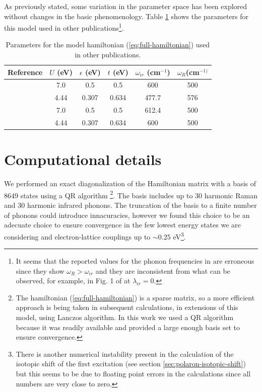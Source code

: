 As previously stated, some variation in the parameter space has been explored without changes in the basic phenomenology. Table \ref{tab:parameters} shows the parameters for this model used in other publications\footnote{It seems that the reported values for the phonon frequencies in \cite{Salkola1994, Salkola1995} are erroneous since they show $\omega_R > \omega_{ir}$ and they are inconsistent from what can be observed, for example, in Fig. 1 of \cite{Salkola1994} at $\lambda_{ir}=0$.}.

\begin{table}[h]
  \centering
  \begin{tabular}[h]{| l | c | c | c | c | c |}
    \hline
    Reference & $U$ (eV) & $\epsilon$ (eV) & $t$ (eV) & $\omega_{ir}$ (cm$^{-1}$) & $\omega_R$(cm$^{-1)}$ \\
    \hline
    \cite{MustredeLeon1992} & 7.0 & 0.5 & 0.5 & 600 & 500 \\ 
    \cite{Salkola1994, Salkola1995} & 4.44 & 0.307 & 0.634 & 477.7 & 576  \\
    \cite{DeLeon1999, Leon2008, MirandaMena2007,Mena2006} & 7.0 & 0.5 & 0.5 & 612.4 & 500 \\ 
    \cite{MustredeLeon2000} & 4.44 & 0.307 & 0.634 & 600 & 500 \\
    \hline
  \end{tabular}
  \caption{Parameters for the model hamiltonian (\ref{eq:full-hamiltonian}) used in other publications.}
  \label{tab:parameters}
\end{table}

\section{Computational details}
\label{sec:comp_details}

We performed an exact diagonalization of the Hamiltonian matrix with a basis of 8649 states using a QR algorithm \cite{eigenweb}\footnote{The hamiltonian (\ref{eq:full-hamiltonian}) is a sparse matrix, so a more efficient approach is being taken in subsequent calculations, in extensions of this model, using Lanczos algorithm. In this work we used a QR algorithm because it was readily available and provided a large enough basis set to ensure convergence.}.
The basis includes up to 30 harmonic Raman and 30 harmonic infrared phonons. 
The  truncation of the basis to a finite number of phonons could introduce innacuracies, however we found this choice to be an adecuate choice to ensure convergence in the few lowest energy states we are considering and electron-lattice couplings up to $\sim0.25$ eV\footnote{There is another numerical instability present in the calculation of the isotopic shift of the first excitation (see section \ref{sec:polaron-isotopic-shift}) but this seems to be due to floating point errors in the calculations since all numbers are very close to zero.}.

